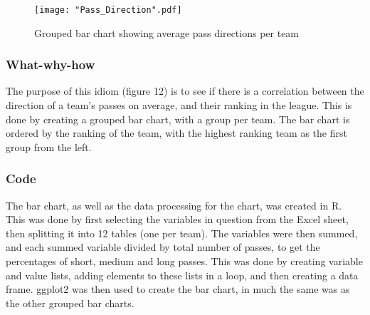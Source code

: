 \documentclass[Report.tex]{subfiles}
\begin{document}
\begin{figure}
\center
\texttt{[image: "Pass\_Direction".pdf]}
\caption{Grouped bar chart showing average pass directions per team}
\label{Fig:Pass_Direction} 
\end{figure}

\subsubsection{What-why-how}
The purpose of this idiom (figure 12) is to see if there is a correlation between the
direction of a team's passes on average, and their ranking in the league. 
This is done by creating a grouped bar chart, with a group per team. The bar
chart is ordered by the ranking of the team, with the highest ranking team as
the first group from the left.


\subsubsection{Code}
The bar chart, as well as the data processing for the chart, was created in R.
This was done by first selecting the variables in question from the Excel sheet,
then splitting it into 12 tables (one per team). The variables were then
summed, and each summed variable divided by total number of passes, to get the
percentages of short, medium and long passes. This was done by creating
variable and value lists, adding elements to these lists in a loop, and then
creating a data frame. 
ggplot2 was then used to create the bar chart, in much the same was as the other
grouped bar charts. 
\end{document}
